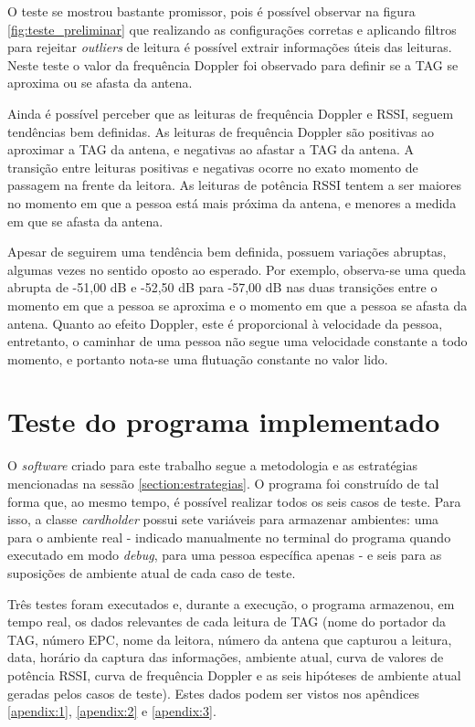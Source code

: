  O teste se mostrou bastante promissor, pois é possível observar na figura \ref{fig:teste_preliminar} que realizando as configurações corretas e aplicando filtros para rejeitar \textit{outliers} de leitura é possível extrair informações úteis das leituras. Neste teste o valor da frequência Doppler foi observado para definir se a TAG se aproxima ou se afasta da antena.
 
 Ainda é possível perceber que as leituras de frequência Doppler e RSSI, seguem tendências bem definidas. As leituras de frequência Doppler são positivas ao aproximar a TAG da antena, e negativas ao afastar a TAG da antena. A transição entre leituras positivas e negativas ocorre no exato momento de passagem na frente da leitora. As leituras de potência RSSI tentem a ser maiores no momento em que a pessoa está mais próxima da antena, e menores a medida em que se afasta da antena.
 
 Apesar de seguirem uma tendência bem definida, possuem variações abruptas, algumas vezes no sentido oposto ao esperado. Por exemplo, observa-se uma queda abrupta de -51,00 dB e -52,50 dB para -57,00 dB nas duas transições entre o momento em que a pessoa se aproxima e o momento em que a pessoa se afasta da antena. Quanto ao efeito Doppler, este é proporcional à velocidade da pessoa, entretanto, o caminhar de uma pessoa não segue uma velocidade constante a todo momento, e portanto nota-se uma flutuação constante no valor lido.

\section{Teste do programa implementado}

O \textit{software} criado para este trabalho segue a metodologia e as estratégias mencionadas na sessão \ref{section:estrategias}. O programa foi construído de tal forma que, ao mesmo tempo, é possível realizar todos os seis casos de teste. Para isso, a classe \textit{cardholder} possui sete variáveis para armazenar ambientes: uma para o ambiente real - indicado manualmente no terminal do programa quando executado em modo \textit{debug}, para uma pessoa específica apenas - e seis para as suposições de ambiente atual de cada caso de teste.

Três testes foram executados e, durante a execução, o programa armazenou, em tempo real, os dados relevantes de cada leitura de TAG (nome do portador da TAG, número EPC, nome da leitora, número da antena que capturou a leitura, data, horário da captura das informações, ambiente atual, curva de valores de potência RSSI, curva de frequência Doppler e as seis hipóteses de ambiente atual geradas pelos casos de teste). Estes dados podem ser vistos nos apêndices \ref{apendix:1}, \ref{apendix:2} e \ref{apendix:3}.

